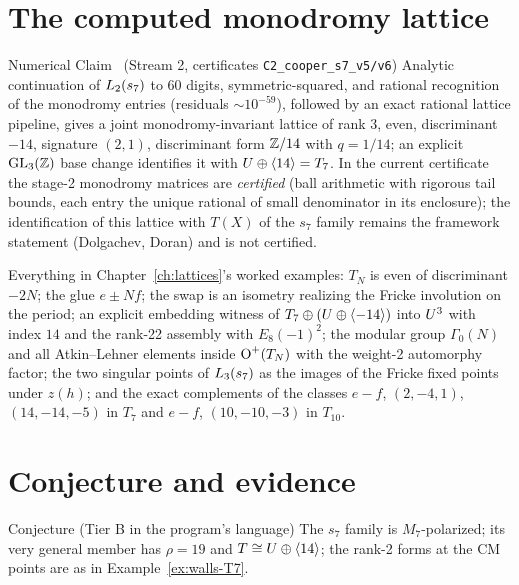 \section{The computed monodromy lattice}

\begin{statusbox}{Numerical Claim \Nstatus\ (Stream 2, certificates \texttt{C2\_cooper\_s7\_v5/v6})}
Analytic continuation of $L_2(s_7)$ to $60$ digits, symmetric-squared, and
rational recognition of the monodromy entries (residuals $\sim10^{-59}$),
followed by an exact rational lattice pipeline, gives a joint
monodromy-invariant lattice of rank $3$, even, discriminant $-14$, signature
$(2,1)$, discriminant form $\mathbb{Z}/14$ with $q=1/14$; an explicit
$\operatorname{GL}_3(\mathbb{Z})$ base change identifies it with $U\oplus\langle 14\rangle=T_7$. In the
current certificate the stage-2 monodromy matrices are \emph{certified}
(ball arithmetic with rigorous tail bounds, each entry the unique rational
of small denominator in its enclosure); the identification of this lattice
with $T(X)$ of the $s_7$ family remains the framework statement
(Dolgachev, Doran) and is not certified.
\end{statusbox}

\begin{theorem}
Everything in Chapter~\ref{ch:lattices}'s worked examples: $T_N$ is even of
discriminant $-2N$; the glue $e\pm Nf$; the swap is an isometry realizing the
Fricke involution on the period; an explicit embedding witness of
$T_7\oplus(U\oplus\langle -14\rangle)$ into $U^3$ with index $14$ and the rank-22
assembly with $E_8(-1)^2$; the modular group $\Gamma_0(N)$ and all
Atkin--Lehner elements inside $\operatorname{O}^+(T_N)$ with the weight-2 automorphy
factor; the two singular points of $L_3(s_7)$ as the images of the Fricke
fixed points under $z(h)$; and the exact complements of the classes
$e-f$, $(2,-4,1)$, $(14,-14,-5)$ in $T_7$ and $e-f$, $(10,-10,-3)$ in
$T_{10}$.
\end{theorem}

\section{Conjecture and evidence}

\begin{statusbox}{Conjecture (Tier B in the program's language)}
The $s_7$ family is $M_7$-polarized; its very general member has $\rho=19$
and $T\cong U\oplus\langle 14\rangle$; the rank-2 forms at the CM points are as in
Example~\ref{ex:walls-T7}.
\end{statusbox}

